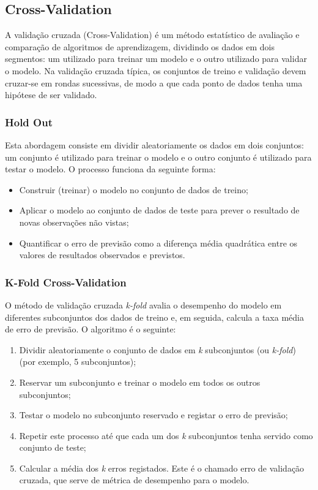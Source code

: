 \documentclass[conference]{IEEEtran}
\begin{document}
\subsection{Cross-Validation}

A validação cruzada (Cross-Validation) é um método estatístico de avaliação e comparação de algoritmos de aprendizagem, dividindo os dados em dois segmentos: um utilizado para treinar um modelo e o outro utilizado para validar o modelo. Na validação cruzada típica, os conjuntos de treino e validação devem cruzar-se em rondas sucessivas, de modo a que cada ponto de dados tenha uma hipótese de ser validado. \cite{refaeilzadeh_cross-validation_2009}

\medskip
\subsubsection{Hold Out}

Esta abordagem consiste em dividir aleatoriamente os dados em dois conjuntos: um conjunto é utilizado para treinar o modelo e o outro conjunto é utilizado para testar o modelo. O processo funciona da seguinte forma: 
\begin{itemize}
	\item Construir (treinar) o modelo no conjunto de dados de treino; 
	\item Aplicar o modelo ao conjunto de dados de teste para prever o resultado de novas observações não vistas; 
	\item Quantificar o erro de previsão como a diferença média quadrática entre os valores de resultados observados e previstos.
\end{itemize}

\medskip
\subsubsection{K-Fold Cross-Validation}

O método de validação cruzada \textit{k-fold} avalia o desempenho do modelo em diferentes subconjuntos dos dados de treino e, em seguida, calcula a taxa média de erro de previsão. O algoritmo é o seguinte:
\begin{enumerate}
	\item Dividir aleatoriamente o conjunto de dados em \textit{k} subconjuntos (ou \textit{k-fold}) (por exemplo, 5 subconjuntos);
	\item Reservar um subconjunto e treinar o modelo em todos os outros subconjuntos;
	\item Testar o modelo no subconjunto reservado e registar o erro de previsão;
	\item Repetir este processo até que cada um dos \textit{k} subconjuntos tenha servido como conjunto de teste; 
	\item Calcular a média dos \textit{k} erros registados. Este é o chamado erro de validação cruzada, que serve de métrica de desempenho para o modelo. 
\end{enumerate}
\end{document}
